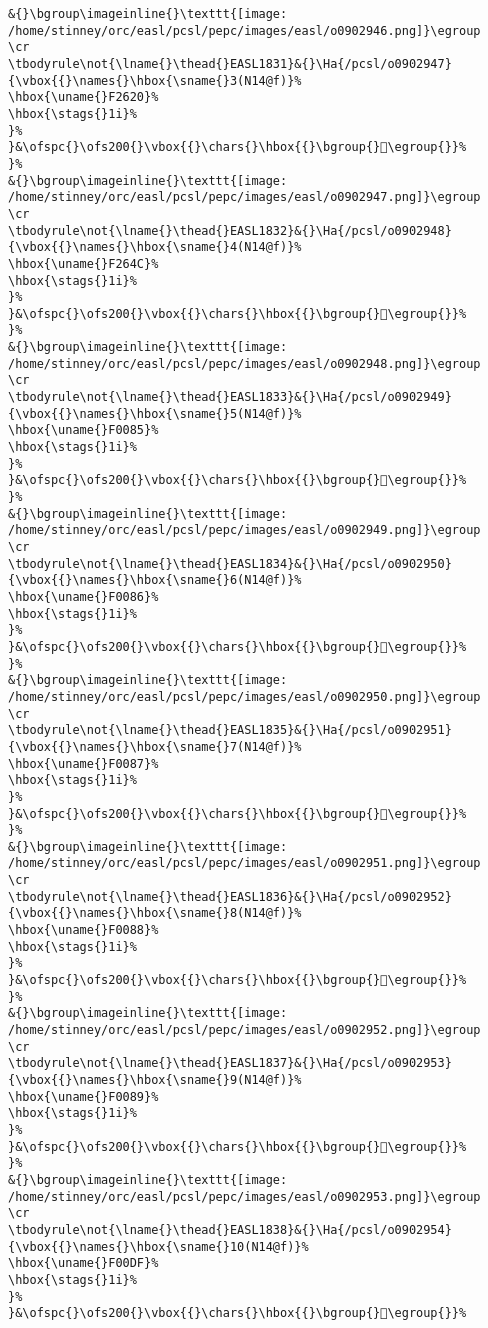 \begin{verbatim}
&{}\bgroup\imageinline{}\texttt{[image: /home/stinney/orc/easl/pcsl/pepc/images/easl/o0902946.png]}\egroup
\cr
\tbodyrule\not{\lname{}\thead{}EASL1831}&{}\Ha{/pcsl/o0902947}{\vbox{{}\names{}\hbox{\sname{}3(N14@f)}%
\hbox{\uname{}F2620}%
\hbox{\stags{}1i}%
}%
}&\ofspc{}\ofs200{}\vbox{{}\chars{}\hbox{{}\bgroup{}󲘠\egroup{}}%
}%
&{}\bgroup\imageinline{}\texttt{[image: /home/stinney/orc/easl/pcsl/pepc/images/easl/o0902947.png]}\egroup
\cr
\tbodyrule\not{\lname{}\thead{}EASL1832}&{}\Ha{/pcsl/o0902948}{\vbox{{}\names{}\hbox{\sname{}4(N14@f)}%
\hbox{\uname{}F264C}%
\hbox{\stags{}1i}%
}%
}&\ofspc{}\ofs200{}\vbox{{}\chars{}\hbox{{}\bgroup{}󲙌\egroup{}}%
}%
&{}\bgroup\imageinline{}\texttt{[image: /home/stinney/orc/easl/pcsl/pepc/images/easl/o0902948.png]}\egroup
\cr
\tbodyrule\not{\lname{}\thead{}EASL1833}&{}\Ha{/pcsl/o0902949}{\vbox{{}\names{}\hbox{\sname{}5(N14@f)}%
\hbox{\uname{}F0085}%
\hbox{\stags{}1i}%
}%
}&\ofspc{}\ofs200{}\vbox{{}\chars{}\hbox{{}\bgroup{}󰂅\egroup{}}%
}%
&{}\bgroup\imageinline{}\texttt{[image: /home/stinney/orc/easl/pcsl/pepc/images/easl/o0902949.png]}\egroup
\cr
\tbodyrule\not{\lname{}\thead{}EASL1834}&{}\Ha{/pcsl/o0902950}{\vbox{{}\names{}\hbox{\sname{}6(N14@f)}%
\hbox{\uname{}F0086}%
\hbox{\stags{}1i}%
}%
}&\ofspc{}\ofs200{}\vbox{{}\chars{}\hbox{{}\bgroup{}󰂆\egroup{}}%
}%
&{}\bgroup\imageinline{}\texttt{[image: /home/stinney/orc/easl/pcsl/pepc/images/easl/o0902950.png]}\egroup
\cr
\tbodyrule\not{\lname{}\thead{}EASL1835}&{}\Ha{/pcsl/o0902951}{\vbox{{}\names{}\hbox{\sname{}7(N14@f)}%
\hbox{\uname{}F0087}%
\hbox{\stags{}1i}%
}%
}&\ofspc{}\ofs200{}\vbox{{}\chars{}\hbox{{}\bgroup{}󰂇\egroup{}}%
}%
&{}\bgroup\imageinline{}\texttt{[image: /home/stinney/orc/easl/pcsl/pepc/images/easl/o0902951.png]}\egroup
\cr
\tbodyrule\not{\lname{}\thead{}EASL1836}&{}\Ha{/pcsl/o0902952}{\vbox{{}\names{}\hbox{\sname{}8(N14@f)}%
\hbox{\uname{}F0088}%
\hbox{\stags{}1i}%
}%
}&\ofspc{}\ofs200{}\vbox{{}\chars{}\hbox{{}\bgroup{}󰂈\egroup{}}%
}%
&{}\bgroup\imageinline{}\texttt{[image: /home/stinney/orc/easl/pcsl/pepc/images/easl/o0902952.png]}\egroup
\cr
\tbodyrule\not{\lname{}\thead{}EASL1837}&{}\Ha{/pcsl/o0902953}{\vbox{{}\names{}\hbox{\sname{}9(N14@f)}%
\hbox{\uname{}F0089}%
\hbox{\stags{}1i}%
}%
}&\ofspc{}\ofs200{}\vbox{{}\chars{}\hbox{{}\bgroup{}󰂉\egroup{}}%
}%
&{}\bgroup\imageinline{}\texttt{[image: /home/stinney/orc/easl/pcsl/pepc/images/easl/o0902953.png]}\egroup
\cr
\tbodyrule\not{\lname{}\thead{}EASL1838}&{}\Ha{/pcsl/o0902954}{\vbox{{}\names{}\hbox{\sname{}10(N14@f)}%
\hbox{\uname{}F00DF}%
\hbox{\stags{}1i}%
}%
}&\ofspc{}\ofs200{}\vbox{{}\chars{}\hbox{{}\bgroup{}󰃟\egroup{}}%

\end{verbatim}
